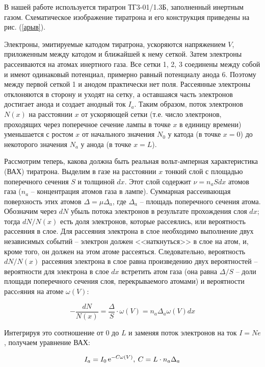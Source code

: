 В нашей работе используется тиратрон ТГ3-01/1.3Б, заполненный инертным газом.
Схематическое изображение тиратрона и его конструкция приведены на рис.
(\ref{арыв}).

Электроны, эмитируемые катодом тиратрона, ускоряются напряжением $V$,
приложенным между катодом и ближайшей к нему сеткой. Затем электроны
рассеиваются на атомах инертного газа. Все сетки 1, 2, 3 соединены между собой и
имеют одинаковый потенциал, примерно равный потенциалу анода 6. Поэтому между
первой сеткой 1 и анодом практически нет поля. Рассеянные электроны отклоняются
в сторону и уходят на сетку, а оставшаяся часть электронов достигает анода и
создает анодный ток $I_a$. Таким образом, поток электронов $N(x)$ на расстоянии
$x$ от ускоряющей сетки (т.е. число электронов, проходящих через поперечное
сечение лампы в точке $x$ в единицу времени) уменьшается с ростом $x$ от
начального значения $N_0$ у катода (в точке $x = 0$) до некоторого значения
$N_a$ у анода (в точке $x = L$).

Рассмотрим теперь, какова должна быть реальная вольт-амперная характеристика
(ВАХ) тиратрона. Выделим в газе на расстоянии $x$ тонкий слой с площадью
поперечного сечения $S$ и толщиной $dx$. Этот слой содержит $\nu = n_a S dx$
атомов газа ($n_a$ -- концентрация атомов газа в лампе). Суммарная рассеивающая
поверхность этих атомов $\Delta = \mu \Delta_a$, где $\Delta_a$ -- площадь
поперечного сечения атома. Обозначим через $dN$ убыль потока электронов в
результате прохождения слоя $dx$; тогда $dN/N(x)$ есть доля электронов, которые
рассеялись, или вероятность рассеяния в слое. Для рассеяния электрона в слое
необходимо выполнение двух независимых событий -- электрон должен <<наткнуться>>
в слое на атом, и, кроме того, он должен на этом атоме рассеяться.
Следовательно, вероятность $dN/N(x)$ рассеяния электрона в слое равна
произведению двух вероятностей -- вероятности для электрона в слое $dx$
встретить атом газа (она равна $\Delta / S$ -- доли площади поперечного сечения
слоя, перекрываемого атомами) и вероятности рассeяния на атоме $\omega(V)$:

\begin{equation}
  - \frac{dN}{N(x)} = \frac{\Delta}{S} \cdot \omega(V) = n_a \Delta_a \omega(V) dx
\end{equation}

Интегрируя это соотношение от $0$ до $L$ и заменяя поток электронов на ток $I =
Ne$, получаем уравнение ВАХ:

\begin{equation} \label{eq::current}
  I_a = I_0 \mathop{\mathrm e}\nolimits^{ - C \omega(V)}, \: C = L \cdot n_a \Delta_a
\end{equation}

